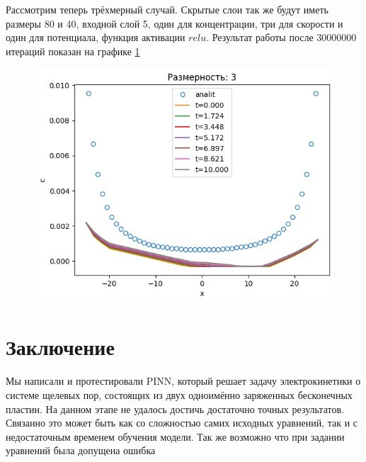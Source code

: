 \documentclass[a4paper,12pt]{article} %
\begin{document}
Рассмотрим теперь трёхмерный случай. Скрытые слои так же будут иметь размеры 80 и 40, входной слой 5, один для концентрации, три для скорости и один для потенциала, функция активации $relu$. Результат работы после 30000000 итераций показан на графике \ref{fig:3dres}

\begin{figure}[h]
    \includegraphics[scale=0.5]{../plots/3dim relu 80 20 30000000.png}
    \caption{}
    \label{fig:3dres}
\end{figure}

\newpage 
\newpage 

\section{Заключение}

Мы написали и протестировали PINN, который решает задачу электрокинетики о системе щелевых пор, состоящих из двух одноимённо заряженных бесконечных пластин. На данном этапе не удалось достичь достаточно точных результатов. Связанно это может быть как со сложностью самих исходных уравнений, так и с недостаточным временем обучения модели. Так же возможно что при задании уравнений была допущена ошибка

\newpage



\end{document}
